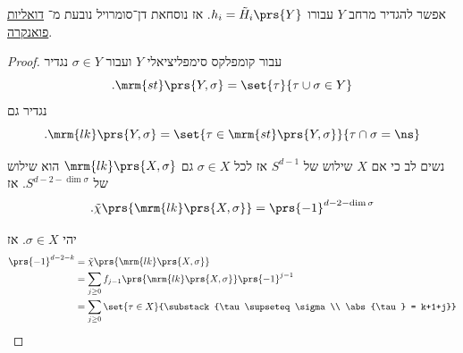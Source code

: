 \documentclass[a4paper,10pt,twoside,openany]{book}
\begin{document}
\begin{remark}
אפשר להגדיר מרחב
$Y$
עבורו
$h_i = \tilde{H}_i\prs{Y}$.
אז נוסחאת דן־סומרויל נובעת מ־%
\href{https://en.wikipedia.org/wiki/Poincar%C3%A9_duality}{דואליות פואנקרה}.
\end{remark}


\begin{proof}
עבור קומפלקס סימפליציאלי
$Y$
ועבור
$\sigma \in Y$
נגדיר
\[\text{.} \mrm{st}\prs{Y,\sigma} = \set{\tau}{\tau \cup \sigma \in Y}\]
נגדיר גם
\[\text{.} \mrm{lk}\prs{Y,\sigma} = \set{\tau \in \mrm{st}\prs{Y,\sigma}}{\tau \cap \sigma = \ns}\]

נשים לב כי אם
$X$
שילוש של
$S^{d-1}$
אז לכל
$\sigma \in X$
גם
$\mrm{lk}\prs{X,\sigma}$
הוא שילוש של
$S^{d-2-\dim\sigma}$.
אז
\[\text{.} \tilde{\chi}\prs{\mrm{lk}\prs{X,\sigma}} = \prs{-1}^{d-2-\dim \sigma}\]

יהי
$\sigma \in X$.
אז
\begin{align*}
\prs{-1}^{d-2-k} &= \tilde{\chi}\prs{\mrm{lk}\prs{X,\sigma}}
\\&= \sum_{j \geq 0} f_{j-1}\prs{\mrm{lk}\prs{X,\sigma}} \prs{-1}^{j-1}
\\&= \sum_{j \geq 0} \set{\tau \in X}{\substack{\tau \supseteq \sigma \\ \abs{\tau} = k+1+j}}
\end{align*}


\end{proof}
\end{document}
